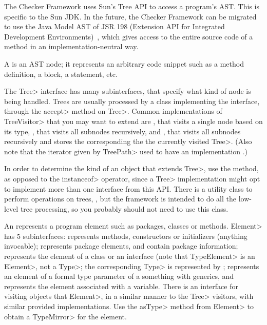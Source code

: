 The Checker Framework uses Sun's Tree API to access a program's AST\@.
This is specific to the Sun JDK\@.  In the future, the Checker Framework
can be migrated to use the Java Model AST of JSR 198 (Extension API for
Integrated Development Environments)~\cite{JSR198}, which gives access to
the entire source code of a method in an implementation-neutral way.


A  is an AST node; it represents an arbitrary code snippet such
as a method definition, a block, a statement, etc.

The \<Tree> interface has many subinterfaces, that specify what
kind of node is being handled. Trees are usually processed by a class
implementing the
interface, through the \<accept> method on \<Tree>. Common
implementations of \<TreeVisitor> that you may want to extend are
,
that visits a single node based on its type,
,
that visits all subnodes recursively, and
,
that visits all subnodes recursively and stores the
corresponding the the currently visited \<Tree>. (Also note that the
iterator given by \<TreePath> used to have an implementation
.)

In order to determine the kind of an object that extends \<Tree>, use
the
method, as opposed to the \<instanceof> operator, since a \<Tree>
implementation might opt to implement more than one interface from
this API\@.  There is a utility class to perform operations on trees,
,
but the framework is intended to do all the low-level tree processing,
so you probably should not need to use this class.

An
represents a program element such as packages, classes or methods.
\<Element> has 5 subinterfaces:
represents methods, constructors or initializers (anything invocable);
represents package elements, and contain package information;
represents the element of a class or an interface (note that
\<TypeElement> is an \<Element>, not a \<Type>; the corresponding
\<Type> is represented by
;
represents an element of a formal type parameter of a something with
generics, and
represents the element associated with a variable. There is an
interface for visiting objects that \<Element>, in a similar manner to the \<Tree> visitors, with similar
provided implementations. Use the \<asType> method from \<Element> to obtain a \<TypeMirror> for the element.

